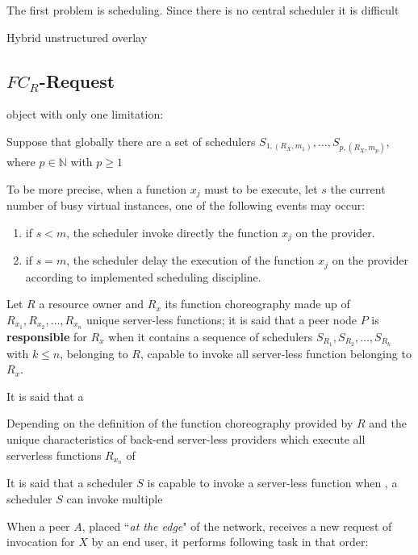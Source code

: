 \documentclass[10pt,a4paper]{article}
\theoremstyle{definition}
\begin{document}
The first problem is scheduling. Since there
is no central scheduler it is difficult



Hybrid unstructured overlay


\subsection{$FC_R$-Request}







 object with only one limitation:

Suppose that globally there are a set of schedulers $S_{1,({R_{X}},m_1)}, \ldots , S_{p,({R_{X}},m_p)}$, where $p \in \mathbb{N}$ with $p \geq 1$



To be more precise, when a function $x_j$ must to be execute, let $s$ the current number of busy virtual instances, one of the following events may occur:
\begin{enumerate}
\item if $s < m$, the scheduler invoke directly the function $x_j$ on the provider.
\item if $s = m$, the scheduler delay the execution of the function $x_j$ on the provider according to implemented scheduling discipline.
\end{enumerate}








Let $R$ a resource owner and $R_x$ its function choreography made up of $R_{x_1}, R_{x_2}, \ldots, R_{x_n}$ unique server-less functions; it is said that a peer node $P$ is \textbf{responsible} for $R_x$ when it contains a sequence of schedulers $S_{R_1}, S_{R_2}, \ldots, S_{R_k}$ with $k \leq n$, belonging to $R$, capable to invoke all server-less function belonging to $R_x$. 

It is said that a 

Depending on the definition of the function choreography provided by $R$ and the unique characteristics of back-end server-less providers which execute all serverless functions $R_{x_n}$ of 




It is said that a scheduler $S$ is capable to invoke a server-less function when 
, a scheduler $S$ can invoke multiple




When a peer $A$, placed ``\textit{at the edge}" of the network, receives a new request of invocation for $X$ by an end user, it performs following task in that order:
\end{document}
